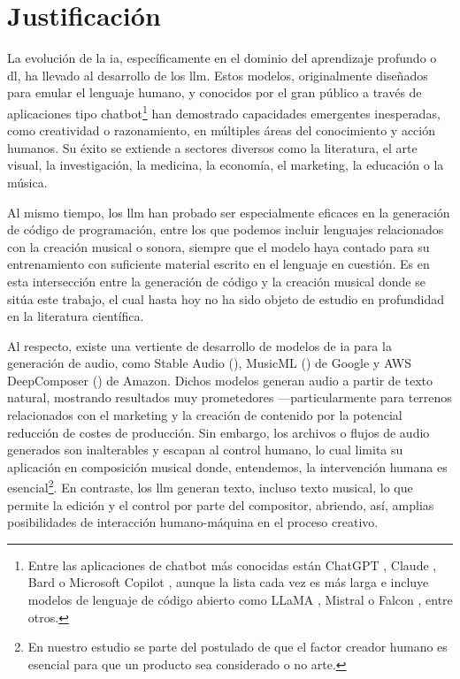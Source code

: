 \section{Justificación}



La evolución de la \gls{ia}, específicamente en el dominio del aprendizaje profundo o \gls{dl}, ha llevado al desarrollo de los \gls{llm}. Estos modelos, originalmente diseñados para emular el lenguaje humano, y conocidos por el gran público a través de aplicaciones tipo {chatbot}\footnote{Entre las aplicaciones de {chatbot} más conocidas están {ChatGPT} \citep{IntroducingChatGPT}, {Claude} \citep{IntroducingClaude}, {Bard} \citep{BardChatbot2024} o {Microsoft Copilot} \citep{mehdiAnnouncingMicrosoftCopilot2023}, aunque la lista cada vez es más larga e incluye modelos de lenguaje de código abierto como {LLaMA} \citep{touvronLLaMAOpenEfficient2023}, {Mistral} \citep{jiangMistral7B2023} o {Falcon} \citep{almazroueiFalconSeriesOpen2023}, entre otros.} han demostrado capacidades emergentes inesperadas, como creatividad o razonamiento, en múltiples áreas del conocimiento y acción humanos. Su éxito se extiende a sectores diversos como la literatura, el arte visual, la investigación, la medicina, la economía, el marketing, la educación o la música. 

Al mismo tiempo, los \gls{llm} han probado ser especialmente eficaces en la generación de código de programación, entre los que podemos incluir lenguajes relacionados con la creación musical o sonora, siempre que el modelo haya contado para su entrenamiento con suficiente material escrito en el lenguaje en cuestión. Es en esta intersección entre la generación de código y la creación musical donde se sitúa este trabajo, el cual hasta hoy no ha sido objeto de estudio en profundidad en la literatura científica.

Al respecto, existe una vertiente de desarrollo de modelos de \gls{ia} para la generación de audio, como {Stable Audio} (\citeyear{Audio}), {MusicML} (\citeyear{MusicLM}) de Google y {AWS DeepComposer} (\citeyear{AWSDeepComposer}) de Amazon. Dichos modelos generan audio a partir de texto natural, mostrando resultados muy prometedores ---particularmente para terrenos relacionados con el marketing y la creación de contenido por la potencial reducción de costes de producción. Sin embargo, los archivos o flujos de audio generados son inalterables y escapan al control humano, lo cual limita su aplicación en composición musical donde, entendemos, la intervención humana es esencial\footnote{En nuestro estudio se parte del postulado de que el factor creador humano es esencial para que un producto sea considerado o no arte.}. En contraste, los \gls{llm} generan texto, incluso texto musical, lo que permite la edición y el control por parte del compositor, abriendo, así, amplias posibilidades de interacción humano-máquina en el proceso creativo.

